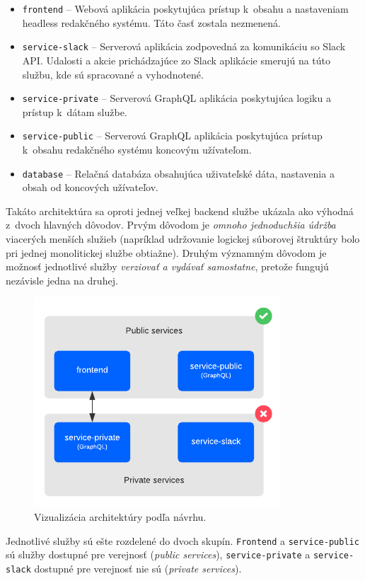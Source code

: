 \begin{itemize}
	\item \texttt{frontend} -- Webová aplikácia poskytujúca prístup k~obsahu a nastaveniam headless redakčného systému. Táto časť zostala nezmenená.
	\item \texttt{service-slack} -- Serverová aplikácia zodpovedná za komunikáciu so Slack API. Udalosti a akcie prichádzajúce zo Slack aplikácie smerujú na túto službu, kde sú spracované a vyhodnotené.
	\item \texttt{service-private} -- Serverová GraphQL aplikácia poskytujúca logiku a prístup k~dátam  službe.
	\item \texttt{service-public} -- Serverová GraphQL aplikácia poskytujúca prístup k~obsahu redakčného systému koncovým užívateľom.
	\item \texttt{database} -- Relačná databáza obsahujúca uživateľské dáta, nastavenia a obsah od koncových užívateľov.
\end{itemize}

\noindent Takáto architektúra sa oproti jednej veľkej backend službe ukázala ako výhodná z~dvoch hlavných dôvodov. Prvým dôvodom je \emph{omnoho jednoduchšia údržba} viacerých menších služieb (napríklad udržovanie logickej súborovej štruktúry bolo pri jednej monolitickej službe obtiažne). Druhým významným dôvodom je možnosť jednotlivé služby \emph{verziovať a vydávať samostatne}, pretože fungujú nezávisle jedna na druhej.


\begin{figure}[h]
	\centering
	\includegraphics[scale=1.4]{obrazky-figures/architecture}
	\caption{Vizualizácia architektúry podľa návrhu.}
\end{figure}

Jednotlivé služby sú ešte rozdelené do dvoch skupín. \texttt{Frontend} a \texttt{service-public} sú služby dostupné pre verejnosť (\emph{public services}), \texttt{service-private} a \texttt{service-slack} dostupné pre verejnosť nie sú (\emph{private services}). 

